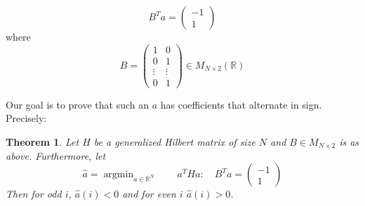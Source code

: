 \documentclass[11pt]{article}
\newtheorem{thm}{Theorem}[section]
\theoremstyle{definition}
\theoremstyle{remark}
\numberwithin{equation}{section}
\DeclareMathOperator{\argmin}{argmin}
\begin{document}
\begin{equation}
B^T a = \begin{pmatrix} -1 \\ 1\end{pmatrix}
\end{equation}
where \[B = \begin{pmatrix} 1 & 0\\ 
0 & 1 \\
\vdots & \vdots
\\ 
0 & 1 \end{pmatrix} \in M_{N\times 2}(\mathbb{R})\]

Our goal is to prove that such an $a$ has coefficients that alternate in sign. Precisely: 

\begin{thm}\label{positivity-hilbert-coefficients}
Let $H$ be a generalized Hilbert matrix of size $N$ and $B \in M_{N\times 2}$ is as above. Furthermore, let 
\[ \hat{a} = \argmin_{a\in\mathbb{R}^N} \quad \quad a^THa : \quad B^Ta = \begin{pmatrix} -1 \\ 1 \end{pmatrix}\]
Then for odd $i$, $\hat{a}(i) < 0$ and for even $i$ $\hat{a}(i) > 0$.
\end{thm} 
\end{document}
